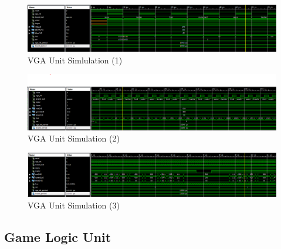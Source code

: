 \documentclass{article}
\begin{document}
    \begin{figure}[h]
      \centering
      \includegraphics[width=1\linewidth]{homework3-4}
      \caption{VGA Unit Simlulation (1)}
      \label{fig:homework3-4}
    \end{figure}

    \begin{figure}[h]
      \centering
      \includegraphics[width=1\linewidth]{homework3-5}
      \caption{VGA Unit Simulation (2)}
      \label{fig:homework3-5}
    \end{figure}


    \begin{figure}
      \centering
      \includegraphics[width=1\linewidth]{homework3-6}
      \caption{VGA Unit Simulation (3)}
      \label{fig:homework3-6}
    \end{figure}


    \subsection{Game Logic Unit}
    \label{sec:gamelogicunit}

    
\end{document}
